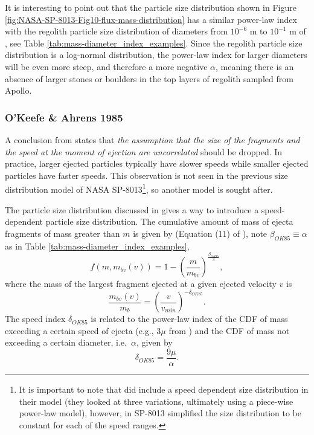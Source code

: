 \documentclass{article}
\begin{document}
It is interesting to point out that the particle size distribution shown in Figure \ref{fig:NASA-SP-8013-Fig10-flux-mass-distribution} has a similar power-law index with the regolith particle size distribution of diameters from $10^{-6}$ m to $10^{-1}$ m of \cite{carrier2003particle}, see Table \ref{tab:mass-diameter_index_examples}. Since the regolith particle size distribution is a log-normal distribution, the power-law index for larger diameters will be even more steep, and therefore a more negative $\alpha$, meaning there is an absence of larger stones or boulders in the top layers of regolith sampled from Apollo.

\subsubsection{O'Keefe \& Ahrens 1985}
A conclusion from \cite{sachse2015correlation} states that \textit{the assumption that the size of the fragments and the speed at the moment of ejection are uncorrelated} should be dropped. In practice, larger ejected particles typically have slower speeds while smaller ejected particles have faster speeds. This observation is not seen in the previous size distribution model of NASA SP-8013\footnote{It is important to note that \cite{zook1967problem} did include a speed dependent size distribution in their model (they looked at three variations, ultimately using a piece-wise power-law model), however, \cite{cour1969meteoroid} in SP-8013 simplified the size distribution to be constant for each of the speed ranges.}, so another model is sought after.

The particle size distribution discussed in \cite{oKeefe1985impact} gives a way to introduce a speed-dependent particle size distribution. The cumulative amount of mass of ejecta fragments of mass greater than $m$ is given by (Equation (11) of \cite{oKeefe1985impact}), note $\beta_{OK85} \equiv \alpha$ as in Table \ref{tab:mass-diameter_index_examples},
\begin{equation}
f(m, m_{bv}(v)) = 1 - \left(\frac{m}{m_{bv}}\right)^{\frac{\beta_{OK85}}{3}},
\end{equation}
where the mass of the largest fragment ejected at a given ejected velocity $v$ is
\begin{equation}
\frac{m_{bv}(v)}{m_b} = \left(\frac{v}{v_{min}}\right)^{-\delta_{OK85}}.
\end{equation}
The speed index $\delta_{OK85}$ is related to the power-law index of the CDF of mass exceeding a certain speed of ejecta (e.g., $3\mu$ from \cite{housen2011ejecta}) and the CDF of mass not exceeding a certain diameter, i.e.\ $\alpha$, given by
\begin{equation}
\delta_{OK85} = \frac{9\mu}{\alpha}.
\end{equation}
\end{document}
